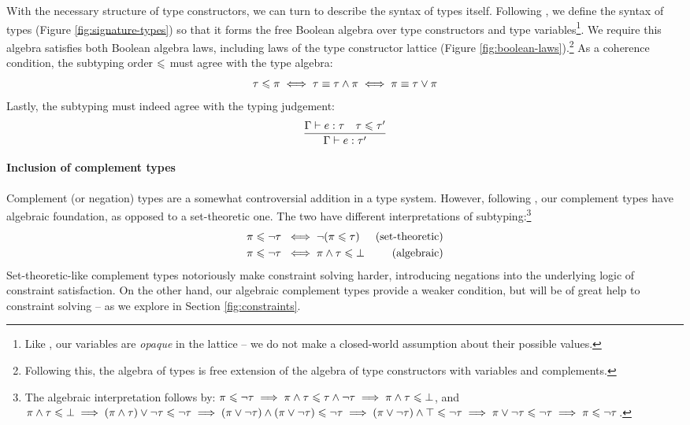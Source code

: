 With the necessary structure of type constructors, we can turn to describe the syntax of types itself. Following \textcite{mlstruct}, we define the syntax of types (Figure \ref{fig:signature-types}) so that it forms the free Boolean algebra over type constructors and type variables\footnote{Like \textcite{dolan-thesis}, our variables are \emph{opaque} in the lattice -- we do not make a closed-world assumption about their possible values.}. We require this algebra satisfies both Boolean algebra laws, including laws of the type constructor lattice (Figure \ref{fig:boolean-laws}).\footnote{Following this, the algebra of types is free extension of the algebra of type constructors with variables and complements.} As a coherence condition, the subtyping order $\leqslant$ must agree with the type algebra:
$$ \tau \leqslant \pi \iff \tau \equiv \tau \land \pi \iff \pi \equiv \tau \lor \pi $$
Lastly, the subtyping must indeed agree with the typing judgement:
$$ \dfrac{\Gamma \vdash e : \tau \quad \tau \leqslant \tau'}{\Gamma \vdash e : \tau'}  $$

\paragraph{Inclusion of complement types} Complement (or negation) types are a somewhat controversial addition in a type system. However, following \textcite{mlstruct}, our complement types have algebraic foundation, as opposed to a set-theoretic one. The two have different interpretations of subtyping:\footnote{The algebraic interpretation follows by: $\pi \leqslant \lnot \tau \implies \pi \land \tau \leqslant \tau \land \lnot \tau \implies \pi \land \tau \leqslant \bot$, and $\pi \land \tau \leqslant \bot \implies (\pi \land \tau) \lor \lnot \tau \leqslant \lnot \tau \implies (\pi \lor \lnot \tau) \land (\pi \lor \lnot \tau) \leqslant \lnot \tau \implies (\pi \lor \lnot \tau) \land \top \leqslant \lnot \tau \implies \pi \lor \lnot \tau \leqslant \lnot \tau \implies \pi \leqslant \lnot \tau$.}
\begin{align*}
    \pi \leqslant \lnot \tau \;&\iff \lnot (\pi \leqslant \tau) & \text{(set-theoretic)} \\
    \pi \leqslant \lnot \tau \;&\iff \pi \land \tau \leqslant \bot & \text{(algebraic)} 
\end{align*}
Set-theoretic-like complement types notoriously make constraint solving harder, introducing negations into the underlying logic of constraint satisfaction. On the other hand, our algebraic complement types provide a weaker condition, but will be of great help to constraint solving -- as we explore in Section \ref{fig:constraints}.

